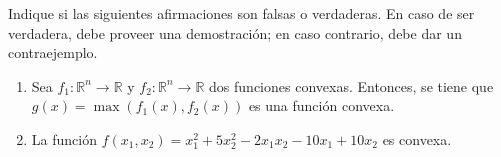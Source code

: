 Indique si las siguientes afirmaciones son falsas o verdaderas. En caso de ser verdadera, debe proveer una demostración; en caso contrario, debe dar un contraejemplo.  
\begin{enumerate}
\item Sea $f_1:\mathbb{R}^{n} \rightarrow \mathbb{R}$ y $f_2:\mathbb{R}^{n} \rightarrow \mathbb{R}$ dos funciones convexas. Entonces, se tiene que $g(x)= \max(f_1(x),f_2(x))$ es una función convexa.
\item La función $f(x_1,x_2)=x_1^{2}+5x_2^{2}-2x_1x_2-10x_1+10x_2$ es convexa.
\end{enumerate}
